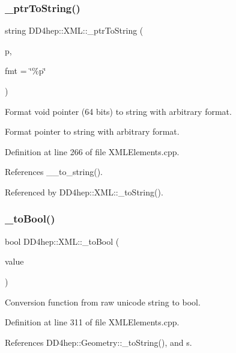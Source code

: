 \subsubsection{\texorpdfstring{\+\_\+ptr\+To\+String()}{\_ptrToString()}}
{\footnotesize\ttfamily string D\+D4hep\+::\+X\+M\+L\+::\+\_\+ptr\+To\+String (\begin{DoxyParamCaption}\item[{const void $\ast$}]{p,  }\item[{const char $\ast$}]{fmt = {\ttfamily \char`\"{}\%p\char`\"{}} }\end{DoxyParamCaption})}



Format void pointer (64 bits) to string with arbitrary format. 

Format pointer to string with arbitrary format. 

Definition at line 266 of file X\+M\+L\+Elements.\+cpp.



References \+\_\+\+\_\+to\+\_\+string().



Referenced by D\+D4hep\+::\+X\+M\+L\+::\+\_\+to\+String().

\hypertarget{group___d_d4_h_e_p___x_m_l_ga4f06ff5f1ca607223cda870587170546}{}\label{group___d_d4_h_e_p___x_m_l_ga4f06ff5f1ca607223cda870587170546} 
\subsubsection{\texorpdfstring{\+\_\+to\+Bool()}{\_toBool()}}
{\footnotesize\ttfamily bool D\+D4hep\+::\+X\+M\+L\+::\+\_\+to\+Bool (\begin{DoxyParamCaption}\item[{const \hyperlink{namespace_d_d4hep_1_1_x_m_l_a09e5d9cc86ed782f6826dfe0778c1815}{Xml\+Char} $\ast$}]{value }\end{DoxyParamCaption})}



Conversion function from raw unicode string to bool. 



Definition at line 311 of file X\+M\+L\+Elements.\+cpp.



References D\+D4hep\+::\+Geometry\+::\+\_\+to\+String(), and s.



